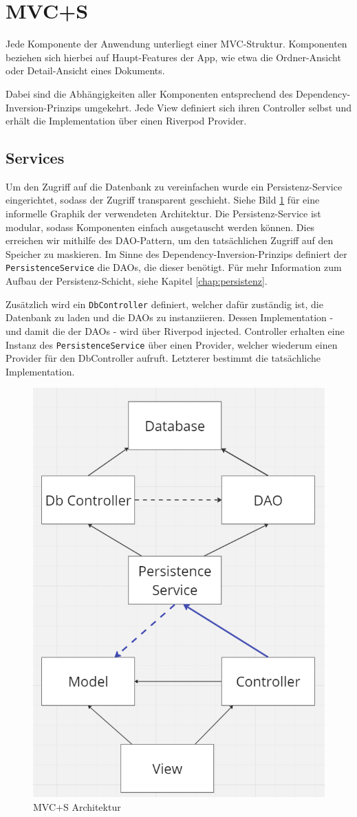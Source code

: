 \section{MVC+S}

Jede Komponente der Anwendung unterliegt einer MVC-Struktur.
Komponenten beziehen sich hierbei auf Haupt-Features der App, wie etwa die Ordner-Ansicht oder Detail-Ansicht eines Dokuments.

Dabei sind die Abhängigkeiten aller Komponenten entsprechend des Dependency-Inversion-Prinzips umgekehrt. Jede View definiert sich ihren Controller selbst und erhält die Implementation über einen Riverpod Provider.

\subsection{Services}

Um den Zugriff auf die Datenbank zu vereinfachen wurde ein Persistenz-Service eingerichtet, sodass der Zugriff transparent geschieht.
Siehe Bild \ref{img:mvcps} für eine informelle Graphik der verwendeten Architektur.
Die Persistenz-Service ist modular, sodass Komponenten einfach ausgetauscht werden können.
Dies erreichen wir mithilfe des DAO-Pattern, um den tatsächlichen Zugriff auf den Speicher zu maskieren.
Im Sinne des Dependency-Inversion-Prinzips definiert der \verb|PersistenceService| die DAOs, die dieser benötigt.
Für mehr Information zum Aufbau der Persistenz-Schicht, siehe Kapitel \ref{chap:persistenz}.

Zusätzlich wird ein \verb|DbController| definiert, welcher dafür zuständig ist, die Datenbank zu laden und die DAOs zu instanziieren. Dessen Implementation - und damit die der DAOs - wird über Riverpod injected. Controller erhalten eine Instanz des \verb|PersistenceService| über einen Provider, welcher wiederum einen Provider für den DbController aufruft. Letzterer bestimmt die tatsächliche Implementation.

\begin{figure}[h]
  \centering
  \includegraphics[height=0.5\textwidth]{figures/mvc_p_s.png}
  \caption{MVC+S Architektur}
  \label{img:mvcps}
\end{figure}


